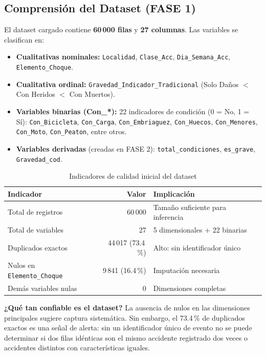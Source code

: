 \documentclass[11pt,a4paper]{article}
\begin{document}
\subsection{Comprensión del Dataset (FASE 1)}

El dataset cargado contiene \textbf{60\,000 filas} y \textbf{27 columnas}. Las variables se
clasifican en:

\begin{itemize}
  \item \textbf{Cualitativas nominales:} \texttt{Localidad}, \texttt{Clase\_Acc},
        \texttt{Dia\_Semana\_Acc}, \texttt{Elemento\_Choque}.
  \item \textbf{Cualitativa ordinal:}
        \texttt{Gravedad\_Indicador\_Tradicional} (Solo Daños $<$ Con Heridos $<$ Con
        Muertos).
  \item \textbf{Variables binarias (Con\_*):} 22 indicadores de condición (0 = No, 1 =
        Sí): \texttt{Con\_Bicicleta}, \texttt{Con\_Carga}, \texttt{Con\_Embriaguez},
        \texttt{Con\_Huecos}, \texttt{Con\_Menores}, \texttt{Con\_Moto},
        \texttt{Con\_Peaton}, entre otros.
  \item \textbf{Variables derivadas} (creadas en FASE 2): \texttt{total\_condiciones},
        \texttt{es\_grave}, \texttt{Gravedad\_cod}.
\end{itemize}

\begin{table}[H]
\centering
\caption{Indicadores de calidad inicial del dataset}
\label{tab:calidad}
\begin{tabular}{@{}lrl@{}}
\toprule
Indicador & Valor & Implicación \\
\midrule
Total de registros & 60\,000 & Tamaño suficiente para inferencia \\
Total de variables & 27 & 5 dimensionales + 22 binarias \\
Duplicados exactos & 44\,017 (73.4\,\%) & Alto: sin identificador único \\
Nulos en \texttt{Elemento\_Choque} & 9\,841 (16.4\,\%) & Imputación necesaria \\
Demás variables nulas & 0 & Dimensiones completas \\
\bottomrule
\end{tabular}
\end{table}

\textbf{¿Qué tan confiable es el dataset?} La ausencia de nulos en las dimensiones
principales sugiere captura sistemática. Sin embargo, el 73.4\,\% de duplicados exactos es
una señal de alerta: sin un identificador único de evento no se puede determinar si dos
filas idénticas son el mismo accidente registrado dos veces o accidentes distintos con
características iguales.
\end{document}
